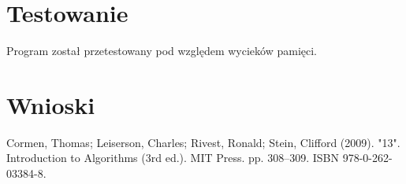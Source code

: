 \section{Testowanie}
\begin{justify}


Program został przetestowany pod względem wycieków pamięci.
\end{justify}

\section{Wnioski}
\begin{justify}

\end{justify}

\begin{thebibliography}{9}
Cormen, Thomas; Leiserson, Charles; Rivest, Ronald; Stein, Clifford (2009). "13". Introduction to Algorithms (3rd ed.). MIT Press. pp. 308–309. ISBN 978-0-262-03384-8.

\bibitem{}

\end{thebibliography}





